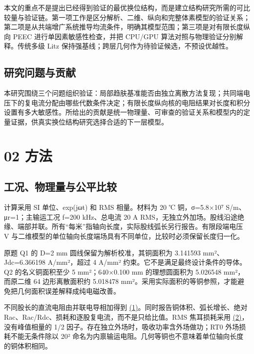 \documentclass[journal,10pt]{IEEEtran}
\begin{document}
本文的重点不是提出已经得到验证的最优换位结构，而是建立结构研究所需的可比较量与验证链。第一项工作是区分解析、二维、纵向和完整体素模型的验证关系；第二项是从共端增广系统推导均流条件，明确其模型范围；第三项是对有限长度纵向 PEEC 进行单因素敏感性检查，并把 CPU/GPU 算法对照与物理验证分别解释。传统多级 Litz 保持强基线；跨层几何作为待验证候选，不预设优越性。


\subsection*{研究问题与贡献}
\hypertarget{01.scope.heading}{}
本研究围绕三个问题组织验证：局部趋肤基准能否由独立离散方法复现；共同端电压下的复电流分配由哪些代数条件决定；有限长度纵向核的电阻结果对长度和积分设置有多大敏感性。所给出的贡献是统一物理量、可审查的验证关系和模型内的定量证据，供真实换位结构研究选择合适的下一层模型。


\FloatBarrier
\section*{02 方法}
\hypertarget{chapter-02}{}
\subsection*{工况、物理量与公平比较}
\hypertarget{02.conventions.heading}{}
计算采用 SI 单位、exp(jωt) 和 RMS 相量。材料为 20 ℃ 铜，σ=5.8×10⁷ S/m、μr=1；主输运工况 f=200 kHz、总电流 20 A RMS，无独立外加场。股线沿途绝缘、端部并联。所有“每米”指轴向长度，实际股线弧长另行报告。有限段端电压 V 与二维模型的单位轴向长度端场具有不同单位，比较时必须保留长度归一化。


原题 Q1 的 D=2 mm 圆线保留为解析校准，其铜面积为 3.141593 mm²、Jdc=6.366198 A/mm²，超过 4 A/mm² 约束。它不是满足最终设计条件的导体。Q2 的名义铜面积至少 5 mm²；640×0.100 mm 的理想圆面积为 5.026548 mm²，而原二维 64 边形离散面积约 5.018478 mm²。采用实际面积的等铜参照，才能避免把几何面积误差解释成纯电磁改善。


不同股长的直流电阻由并联电导相加得到 \href{paper_zh-CN_ieee.pdf#E01}{(1)}。同时报告铜体积、弧长增长、绝对 Rac、Rac/Rdc、损耗和逐股复电流，而不是只给比值。RMS 焦耳损耗采用 \href{paper_zh-CN_ieee.pdf#E02}{(2)}，没有峰值相量的 1/2 因子。存在独立外场时，吸收功率含外场做功；RT0 外场损耗不能无条件除以 20² 命名为内禀输运电阻。几何等铜也不意味着单位轴向长度的铜体积相同。
\end{document}
